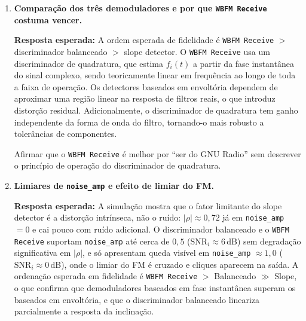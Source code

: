 \documentclass[11pt,a4paper]{article}
\begin{document}
\begin{enumerate}[label=\textbf{Q\arabic*.}, leftmargin=*, itemsep=1em]
    \textbf{Resposta esperada:} Os dois ramos produzem envoltórias
    aproximadamente $K_0 + K_1 m(t) + \alpha m^2(t) + \cdots$ e
    $K_0 - K_1 m(t) + \alpha m^2(t) + \cdots$. A subtração cancela o termo
    constante $K_0$ e os termos de ordem par, restando $2 K_1 m(t)$ mais
    distorção de ordem ímpar, conforme a Equação~(2) do enunciado. O
    resultado é maior fidelidade na recuperação da mensagem, melhor
    linearidade na região central e dispensa parcial do bloqueio CC. No
    Time Sink isso aparece como um cosseno mais simétrico, com menos
    distorção visível e amplitude maior.

    \begin{nota}
      Dizer apenas que ``dois filtros são melhores que um'' sem mostrar
      explicitamente o cancelamento do termo CC e da distorção de ordem par.
    \end{nota}

  \item \textbf{Comparação dos três demoduladores e por que \texttt{WBFM Receive} costuma vencer.}

    \textbf{Resposta esperada:} A ordem esperada de fidelidade é
    \texttt{WBFM Receive} $>$ discriminador balanceado $>$ slope detector.
    O \texttt{WBFM Receive} usa um discriminador de quadratura, que estima
    $f_i(t)$ a partir da fase instantânea do sinal complexo, sendo
    teoricamente linear em frequência ao longo de toda a faixa de operação.
    Os detectores baseados em envoltória dependem de aproximar uma região
    linear na resposta de filtros reais, o que introduz distorção residual.
    Adicionalmente, o discriminador de quadratura tem ganho independente da
    forma de onda do filtro, tornando-o mais robusto a tolerâncias de
    componentes.

    \begin{nota}
      Afirmar que o \texttt{WBFM Receive} é melhor por ``ser do GNU Radio''
      sem descrever o princípio de operação do discriminador de quadratura.
    \end{nota}

  \item \textbf{Limiares de \texttt{noise\_amp} e efeito de limiar do FM.}

    \textbf{Resposta esperada:} A simulação mostra que o fator limitante do
    slope detector é a distorção intrínseca, não o ruído: $|\rho| \approx 0{,}72$
    já em \texttt{noise\_amp} $= 0$ e cai pouco com ruído adicional. O
    discriminador balanceado e o \texttt{WBFM Receive} suportam
    \texttt{noise\_amp} até cerca de $0{,}5$ ($\text{SNR}_i \approx 6$\,dB) sem
    degradação significativa em $|\rho|$, e só apresentam queda visível em
    \texttt{noise\_amp} $\approx 1{,}0$ ($\text{SNR}_i \approx 0$\,dB), onde o
    limiar do FM é cruzado e cliques aparecem na saída. A ordenação esperada
    em fidelidade é \texttt{WBFM Receive} $>$ Balanceado $\gg$ Slope, o que
    confirma que demoduladores baseados em fase instantânea superam os
    baseados em envoltória, e que o discriminador balanceado lineariza
    parcialmente a resposta da inclinação.


\end{enumerate}
\end{document}

